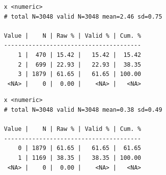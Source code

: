 \documentclass[
  letterpaper,
  DIV=11,
  numbers=noendperiod]{scrreprt}
\newenvironment{Shaded}{\begin{snugshade}}{\end{snugshade}}
\newcommand{\AttributeTok}[1]{\textcolor[rgb]{0.40,0.45,0.13}{#1}}
\newcommand{\CommentTok}[1]{\textcolor[rgb]{0.37,0.37,0.37}{#1}}
\newcommand{\DecValTok}[1]{\textcolor[rgb]{0.68,0.00,0.00}{#1}}
\newcommand{\FunctionTok}[1]{\textcolor[rgb]{0.28,0.35,0.67}{#1}}
\newcommand{\NormalTok}[1]{\textcolor[rgb]{0.00,0.23,0.31}{#1}}
\newcommand{\OtherTok}[1]{\textcolor[rgb]{0.00,0.23,0.31}{#1}}
\newcommand{\SpecialCharTok}[1]{\textcolor[rgb]{0.37,0.37,0.37}{#1}}
\begin{document}
\begin{Shaded}
\end{Shaded}

\begin{verbatim}
x <numeric> 
# total N=3048 valid N=3048 mean=2.46 sd=0.75

Value |    N | Raw % | Valid % | Cum. %
---------------------------------------
    1 |  470 | 15.42 |   15.42 |  15.42
    2 |  699 | 22.93 |   22.93 |  38.35
    3 | 1879 | 61.65 |   61.65 | 100.00
 <NA> |    0 |  0.00 |    <NA> |   <NA>
\end{verbatim}

\begin{Shaded}
\end{Shaded}

\begin{verbatim}
x <numeric> 
# total N=3048 valid N=3048 mean=0.38 sd=0.49

Value |    N | Raw % | Valid % | Cum. %
---------------------------------------
    0 | 1879 | 61.65 |   61.65 |  61.65
    1 | 1169 | 38.35 |   38.35 | 100.00
 <NA> |    0 |  0.00 |    <NA> |   <NA>
\end{verbatim}
\end{document}
